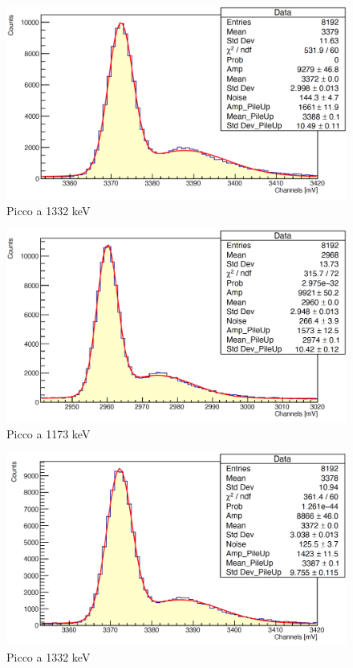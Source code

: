 \documentclass[a4paper,10pt]{article}
\begin{document}
\begin{figure}[H]
    \centering
    \includegraphics[scale=0.45]{appendice/spettri/CoPb2_21}
    \caption{Picco a 1332 keV}
\end{figure}
\begin{figure}[H]
    \centering
    \includegraphics[scale=0.45]{appendice/spettri/CoPb1_33}
    \caption{Picco a 1173 keV}
\end{figure}
\begin{figure}[H]
    \centering
    \includegraphics[scale=0.45]{appendice/spettri/CoPb2_33}
    \caption{Picco a 1332 keV}
\end{figure}
\end{document}
